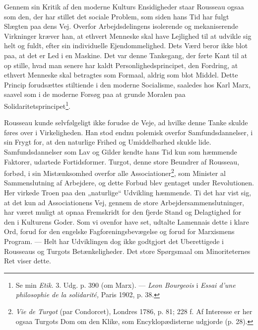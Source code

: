 \documentclass[12pt,a4paper,openany]{book}
\newcommand{\opage}[1]{\marginnote{\footnotesize\textit{[#1]}}}
\begin{document}
Gennem sin Kritik af den moderne Kulturs Ensidigheder
staar Rousseau ogsaa som den, der har stillet det sociale Problem,
som siden hans Tid har fulgt Slægten paa dens Vej.
Overfor Arbejdsdelingens isolerende og mekaniserende Virkninger
kræver han, at ethvert Menneske skal have Lejlighed til
at udvikle sig helt og fuldt, efter sin individuelle Ejendommelighed.
Dets Værd beror ikke blot paa, at det er Led i en
Maskine. Det var denne Tankegang, der førte Kant til at op%
\setcounter{footnote}{0}%
\opage{137}stille, hvad man senere har kaldt Personlighedsprincipet, den
Fordring, at ethvert Menneske skal betragtes som Formaal, aldrig
som blot Middel. Dette Princip forudsættes stiltiende i
den moderne Socialisme, saaledes hos Karl Marx, saavel som
i de moderne Forsøg paa at grunde Moralen paa Solidaritetsprincipet\footnote[1]{Se min \textit{Etik.} 3. Udg. p. 390 (om Marx). --- \emph{Leon Bourgeois} i \textit{Essai d’une philosophie de la solidarité,} Paris 1902, p. 38.}.


Rousseau kunde selvfølgeligt ikke forudse de Veje, ad
hvilke denne Tanke skulde føres over i Virkeligheden. Han
stod endnu polemisk overfor Samfundsdannelser, i sin Frygt
for, at den naturlige Frihed og Umiddelbarhed skulde lide.
Samfundsdannelser som Lav og Gilder kendte hans Tid kun
som hæmmende Faktorer, udartede Fortidsformer. Turgot,
denne store Beundrer af Rousseau, forbød, i sin Mistænksomhed
overfor alle Associationer\footnote[2]{\textit{Vie de Turgot} (par Condorcet), Londres 1786, p. 81; 228 f. Af Interesse er her ogsaa Turgots Dom om den Klike, som Encyklopædisterne udgjorde (p. 28).}, som Minister al Sammenslutning af
Arbejdere, og dette Forbud blev gentaget under Revolutionen.
Her virkede Troen paa den „naturlige“ Udvikling hæmmende.
Ti det har vist sig, at det kun ad Associationens Vej, gennem
de store Arbejdersammenslutninger, har været muligt at opnaa
Fremskridt for den fjerde Stand og Delagtighed for den i Kulturens
Goder. Som vi ovenfor have set, udtalte Lamennais
dette i klare Ord, forud for den engelske Fagforeningsbevægelse
og forud for Marxismens Program. --- Helt har Udviklingen dog
ikke godtgjort det Uberettigede i Rousseaus og Turgots Betænkeligheder.
Det store Spørgsmaal om Minoriteternes Ret
viser dette.
\end{document}
